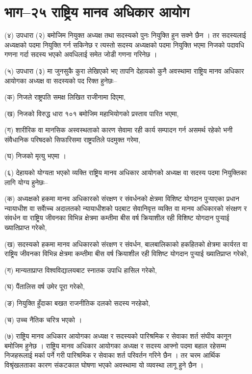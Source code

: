 \section{भाग–२५ राष्ट्रिय मानव अधिकार आयोग}

(४) उपधारा (२) बमोजिम नियुक्त अध्यक्ष तथा सदस्यको पुनः नियुक्ति हुन सक्ने छैन ।
तर सदस्यलाई अध्यक्षको पदमा नियुक्ति गर्न सकिनेछ र त्यस्तो सदस्य अध्यक्षको पदमा नियुक्ति भएमा निजको पदावधि गणना गर्दा सदस्य भएको अवधिलाई समेत जोडी गणना गरिनेछ ।

(५) उपधारा (३) मा जुनसुकै कुरा लेखिएको भए तापनि देहायको कुनै अवस्थामा राष्ट्रिय मानव अधिकार आयोगका अध्यक्ष वा सदस्यको पद रिक्त हुनेछः–

(क) निजले राष्ट्रपति समक्ष लिखित राजीनामा दिएमा,

(ख) निजको विरुद्ध धारा १०१ बमोजिम महाभियोगको प्रस्ताव पारित भएमा,

(ग) शारीरिक वा मानसिक अस्वस्थताको कारण सेवामा रही कार्य सम्पादन गर्न असमर्थ रहेको भनी संवैधानिक परिषदको
सिफारिसमा राष्ट्रपतिले पदमुक्त गरेमा,

(घ) निजको मृत्यु भएमा ।

(६) देहायको योग्यता भएको व्यक्ति राष्ट्रिय मानव अधिकार आयोगको अध्यक्ष वा सदस्य पदमा नियुक्तिका लागि योग्य हुनेछः–

(क) अध्यक्षको हकमा मानव अधिकारको संरक्षण र संवर्धनको क्षेत्रमा विशिष्ट योगदान पुर्‍याएका प्रधान न्यायाधीश वा सर्वाेच्च अदालतको न्यायाधीशको पदबाट सेवानिवृत्त व्यक्ति वा मानव अधिकारको संरक्षण र संवर्धन वा राष्ट्रिय जीवनका विभिन्न क्षेत्रमा कम्तीमा बीस वर्ष क्रियाशील रही विशिष्ट योगदान पुर्‍याई ख्यातिप्राप्त गरेको,

(ख) सदस्यको हकमा मानव अधिकारको संरक्षण र संवर्धन, बालबालिकाको हकहितको क्षेत्रमा कार्यरत वा राष्ट्रिय जीवनका विभिन्न क्षेत्रमा कम्तीमा बीस वर्ष क्रियाशील रही विशिष्ट योगदान पुर्‍याई ख्यातिप्राप्त गरेको,

(ग) मान्यताप्राप्त विश्वविद्यालयबाट स्नातक उपाधि हासिल गरेको,

(घ) पैंतालिस वर्ष उमेर पूरा गरेको,

(ङ) नियुक्ति हुँदाका बखत राजनीतिक दलको सदस्य नरहेको,

(च) उच्च नैतिक चरित्र भएको ।

(७) राष्ट्रिय मानव अधिकार आयोगका अध्यक्ष र सदस्यको पारिश्रमिक र सेवाका शर्त संघीय कानून बमोजिम हुनेछ । राष्ट्रिय मानव अधिकार आयोगका अध्यक्ष र सदस्य आफ्नो पदमा बहाल रहेसम्म निजहरूलाई मर्का पर्ने गरी पारिश्रमिक र सेवाका शर्त परिवर्तन गरिने छैन ।
तर चरम आर्थिक विश्रृंखलताका कारण संकटकाल घोषणा भएको अवस्थामा यो व्यवस्था लागू हुने छैन ।

